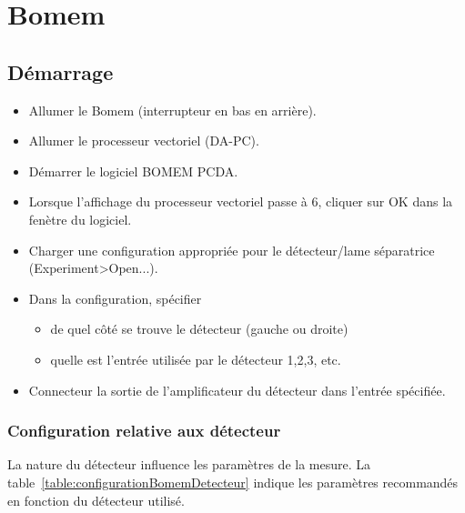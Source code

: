 \documentclass[11pt,francais]{book} %
\begin{document}

\section{Bomem}

\subsection{Démarrage}

\begin{itemize}
\item Allumer le Bomem (interrupteur en bas en arrière).
\item Allumer le processeur vectoriel (DA-PC).
\item Démarrer le logiciel BOMEM PCDA.
\item Lorsque l'affichage du processeur vectoriel passe à 6, cliquer sur OK dans la fenètre du logiciel.
\item Charger une configuration appropriée pour le détecteur/lame séparatrice (Experiment>Open...).
\item Dans la configuration, spécifier
  \begin{itemize}
    \item de quel côté se trouve le détecteur (gauche ou droite)
    \item quelle est l'entrée utilisée par le détecteur 1,2,3, etc.
  \end{itemize}
\item Connecteur la sortie de l'amplificateur du détecteur dans l'entrée spécifiée.
\end{itemize}

\subsubsection{Configuration relative aux détecteur}

La nature du détecteur influence les paramètres de la mesure.
La table~\ref{table:configurationBomemDetecteur} indique les paramètres recommandés en fonction du détecteur utilisé.
\end{document}
